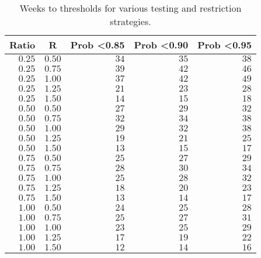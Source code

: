 \begin{table}[!tbp]
\caption{Weeks to thresholds for various testing and restriction strategies.\label{tab:intervention}} 
\begin{center}
\begin{tabular}{rrrrr}
\hline\hline
\multicolumn{1}{c}{Ratio}&\multicolumn{1}{c}{R}&\multicolumn{1}{c}{Prob \textless  0.85}&\multicolumn{1}{c}{Prob \textless  0.90}&\multicolumn{1}{c}{Prob \textless  0.95}\tabularnewline
\hline
$0.25$&$0.50$&$34$&$35$&$38$\tabularnewline
$0.25$&$0.75$&$39$&$42$&$46$\tabularnewline
$0.25$&$1.00$&$37$&$42$&$49$\tabularnewline
$0.25$&$1.25$&$21$&$23$&$28$\tabularnewline
$0.25$&$1.50$&$14$&$15$&$18$\tabularnewline
$0.50$&$0.50$&$27$&$29$&$32$\tabularnewline
$0.50$&$0.75$&$32$&$34$&$38$\tabularnewline
$0.50$&$1.00$&$29$&$32$&$38$\tabularnewline
$0.50$&$1.25$&$19$&$21$&$25$\tabularnewline
$0.50$&$1.50$&$13$&$15$&$17$\tabularnewline
$0.75$&$0.50$&$25$&$27$&$29$\tabularnewline
$0.75$&$0.75$&$28$&$30$&$34$\tabularnewline
$0.75$&$1.00$&$25$&$28$&$32$\tabularnewline
$0.75$&$1.25$&$18$&$20$&$23$\tabularnewline
$0.75$&$1.50$&$13$&$14$&$17$\tabularnewline
$1.00$&$0.50$&$24$&$25$&$28$\tabularnewline
$1.00$&$0.75$&$25$&$27$&$31$\tabularnewline
$1.00$&$1.00$&$23$&$25$&$29$\tabularnewline
$1.00$&$1.25$&$17$&$19$&$22$\tabularnewline
$1.00$&$1.50$&$12$&$14$&$16$\tabularnewline
\hline
\end{tabular}\end{center}
\end{table}
